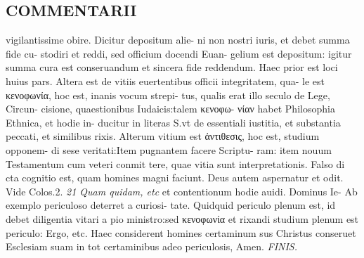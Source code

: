\documentclass{article}
\begin{document}
\begin{pages}
\section*{COMMENTARII }
\marginpar{[ p.170 ]}\pstart vigilantissime obire. Dicitur depositum alie- ni non nostri iuris, et debet summa fide cu- stodiri et reddi, sed officium docendi Euan- gelium est depositum: igitur summa cura est conseruandum et sincera fide reddendum. Haec prior est loci huius pars. Altera est de vitiis euertentibus officii integritatem, qua- le est κενοφωνία, hoc est, inanis vocum strepi- tus, qualis erat illo seculo de Lege, Circun- cisione, quaestionibus Iudaicis:talem κενοφω- νίαν habet Philosophia Ethnica, et hodie in- ducitur in literas S.vt de essentiali iustitia, et substantia peccati, et similibus rixis. Alterum vitium est ἀντιθεσις, hoc est, studium opponem- di sese veritati:Item pugnantem facere Scriptu- ram: item nouum Testamentum cum veteri conmit tere, quae vitia sunt interpretationis. Falso di cta cognitio est, quam homines magni faciunt. Deus autem aspernatur et odit. Vide Colos.2.  \pend
\textit{21 Quam quidam, etc }\pstart et contentionum hodie auidi. Dominus Ie- Ab exemplo periculoso deterret a curiosi- tate. Quidquid periculo plenum est, id debet diligentia vitari a pio ministro:sed κενοφωνία et rixandi studium plenum est periculo: Ergo, etc. Haec considerent homines certaminum sus Christus conseruet Esclesiam suam in tot certaminibus adeo periculosis, Amen.  \pend
\textit{FINIS. }
\end{pages}
\end{document}
